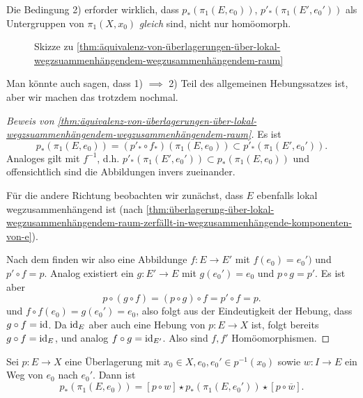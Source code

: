 \begin{warning}
    Die Bedingung 2) erforder wirklich, dass $p_*(\pi_1(E,e_0))$, $p'_*(\pi_1(E',e_0'))$ als Untergruppen von $\pi_1(X,x_0)$ \textit{gleich} sind, nicht nur homöomorph.
\end{warning}

\begin{figure}[ht]
    \centering
    \caption{Skizze zu \autoref{thm:äquivalenz-von-überlagerungen-über-lokal-wegzsuammenhängendem-wegzusammenhängendem-raum}}
    \label{fig:skizze-zur-äquivalenz-von-überlagerungen}
\end{figure}

\begin{oral}
    Man könnte auch sagen, dass 1) $\implies$ 2) Teil des allgemeinen Hebungssatzes ist, aber wir machen das trotzdem nochmal.
\end{oral}

\begin{proof}[Beweis von \autoref{thm:äquivalenz-von-überlagerungen-über-lokal-wegzsuammenhängendem-wegzusammenhängendem-raum}]
    Es ist 
    \[
        p_*(\pi_1(E,e_0)) = (p'_* \circ  f_*)(\pi_1(E,e_0)) \subset p'_*(\pi_1(E',e_0'))
    .\] 
    Analoges gilt mit $f^{-1}$, d.h. $p'_*(\pi_1(E',e_0'))\subset p_*(\pi_1(E,e_0))$ und offensichtlich sind die Abbildungen invers zueinander.

    Für die andere Richtung beobachten wir zunächst, dass $E$ ebenfalls lokal wegzusammenhängend ist (nach  \autoref{thm:überlagerung-über-lokal-wegzusammenhängendem-raum-zerfällt-in-wegzusammenhängende-komponenten-von-e}).

    Nach dem  finden wir also eine Abbildunge $f\colon  E \to  E'$ mit $f(e_0) = e_0')$ und $p' \circ  f = p$. Analog existiert ein $g\colon  E ' \to  E$ mit $g(e_0') = e_0$ und $ p \circ  g = p'$. Es ist aber
    \[
        p \circ (g \circ  f) = (p \circ  g) \circ  f = p' \circ  f = p
    .\] 
    und  $f\circ  f(e_0) = g(e_0' ) = e_0$, also folgt aus der Eindeutigkeit der Hebung, dass $g \circ f = \mathrm{id}$. Da $\mathrm{id}_E$ aber auch eine Hebung von  $p\colon  E \to X$ ist, folgt bereits $g \circ  f = \mathrm{id}_E$, und analog $f \circ  g = \mathrm{id}_{E'}$. Also sind $f,f'$ Homöomorphismen.
\end{proof}

\begin{theorem}\label{thm:charakteristische-untergruppen-innerhalb-der-faser-sind-nur-konjugiert-wenn-weg-zwischen-urbildern-existiert}
    Sei $p\colon  E \to  X$ eine Überlagerung mit $x_0\in X, e_0,e_0' \in p^{-1} (x_0)$ sowie $w\colon  I \to  E$ ein Weg von $e_0$ nach $e_0'$. Dann ist
    \[
        p_*(\pi_1(E,e_0)) = [p \circ  w] \star p_*(\pi_1(E,e_0')) \star [p \circ  \overline{w}]
    .\] 
\end{theorem}

